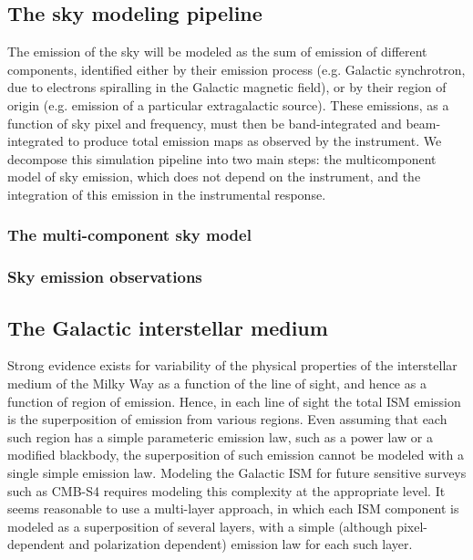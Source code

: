 \subsection{The sky modeling pipeline}

The emission of the sky will be modeled as the sum of emission of different components, identified either by their emission process (e.g. Galactic synchrotron, due to electrons spiralling in the Galactic magnetic field), or by their region of origin (e.g. emission of a particular extragalactic source). These emissions, as a function of sky pixel and frequency, must then be band-integrated and beam-integrated to produce total emission maps as observed by the instrument. We decompose this simulation pipeline into two main steps: the multicomponent model of sky emission, which does not depend on the instrument, and the integration of this emission in the instrumental response.

\subsubsection{The multi-component sky model}

\subsubsection{Sky emission observations}

\subsection{The Galactic interstellar medium}

Strong evidence exists for variability of the physical properties of the interstellar medium of the Milky Way as a function of the line of sight, and hence as a function of region of emission. Hence, in each line of sight  the total ISM emission is the superposition of emission from various regions. Even assuming that each such region has a simple parameteric emission law, such as a power law or a modified blackbody, the superposition of such emission cannot be modeled with a single simple emission law. Modeling the Galactic ISM for future sensitive surveys such as CMB-S4 requires  modeling  this complexity at the appropriate level. It seems reasonable to use a multi-layer approach, in which each ISM component is modeled as a superposition of several layers, with a simple (although pixel-dependent and polarization dependent) emission law for each such layer.

